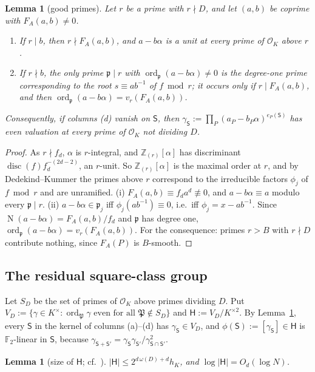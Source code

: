 \documentclass[11pt]{amsart}
\newtheorem{lemma}[theorem]{Lemma}
\theoremstyle{definition}
\newcommand{\Z}{\mathbb{Z}}
\newcommand{\F}{\mathbb{F}}
\newcommand{\cO}{\mathcal{O}}
\newcommand{\sH}{\mathsf{H}}
\newcommand{\sS}{\mathsf{S}}
\newcommand{\fp}{\mathfrak{p}}
\newcommand{\fP}{\mathfrak{P}}
\newcommand{\ord}{\operatorname{ord}}
\newcommand{\disc}{\operatorname{disc}}
\newcommand{\Norm}{\operatorname{N}}
\begin{document}
\begin{lemma}[good primes]\label{lem:C}
Let $r$ be a prime with $r\nmid D$, and let $(a,b)$ be coprime with $F_A(a,b)\ne0$.
\begin{enumerate}[label=(\roman*)]
\item If $r\mid b$, then $r\nmid F_A(a,b)$, and $a-b\alpha$ is a unit at every prime of $\cO_K$ above $r$.
\item If $r\nmid b$, the only prime $\fp\mid r$ with $\ord_\fp(a-b\alpha)\ne0$ is the degree-one prime corresponding to the root $s\equiv ab^{-1}$ of
  $f\bmod r$; it occurs only if $r\mid F_A(a,b)$, and then $\ord_\fp(a-b\alpha)=v_r(F_A(a,b))$.
\end{enumerate}
Consequently, if columns (d) vanish on $\sS$, then $\gamma_\sS:=\prod_P(a_P-b_P\alpha)^{e_P(\sS)}$ has even valuation at every prime of $\cO_K$
not dividing $D$.
\end{lemma}

\begin{proof}
As $r\nmid f_d$, $\alpha$ is $r$-integral, and $\Z_{(r)}[\alpha]$ has discriminant $\disc(f)f_d^{-(2d-2)}$, an $r$-unit. So $\Z_{(r)}[\alpha]$ is
the maximal order at $r$, and by Dedekind--Kummer the primes above $r$ correspond to the irreducible factors $\phi_j$ of $f\bmod r$ and are
unramified. (i) $F_A(a,b)\equiv f_da^d\not\equiv0$, and $a-b\alpha\equiv a$ modulo every $\fp\mid r$. (ii) $a-b\alpha\in\fp_j$ iff
$\phi_j(ab^{-1})\equiv0$, i.e.\ iff $\phi_j=x-ab^{-1}$. Since $\Norm(a-b\alpha)=F_A(a,b)/f_d$ and $\fp$ has degree one,
$\ord_\fp(a-b\alpha)=v_r(F_A(a,b))$. For the consequence: primes $r>B$ with $r\nmid D$ contribute nothing, since $F_A(P)$ is $B$-smooth.
\end{proof}

\subsection{The residual square-class group}
Let $S_D$ be the set of primes of $\cO_K$ above primes dividing $D$. Put $V_D:=\{\gamma\in K^\times:\ord_\fP\gamma\text{ even for all }\fP\notin S_D\}$ and
$\sH:=V_D/K^{\times2}$. By Lemma~\ref{lem:C}, every $\sS$ in the kernel of columns (a)--(d) has $\gamma_\sS\in V_D$, and
$\phi(\sS):=[\gamma_\sS]\in\sH$ is $\F_2$-linear in $\sS$, because $\gamma_{\sS+\sS'}=\gamma_\sS\gamma_{\sS'}/\gamma_{\sS\cap\sS'}^2$.

\begin{lemma}[size of $\sH$; cf.\ {\cite[Thm.~6.7]{blp1993}}]\label{lem:H}
$|\sH|\le2^{d\,\omega(D)+d}h_K$, and $\log|\sH|=O_d(\log N)$.
\end{lemma}
\end{document}
